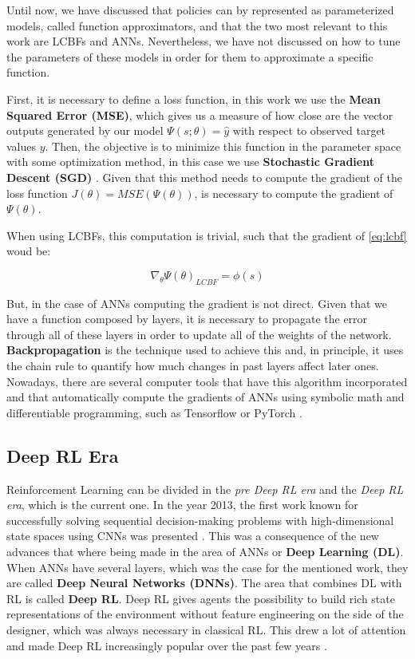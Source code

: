 Until now, we have discussed that policies can by represented as parameterized models, called function approximators, and that the two most relevant to this work are LCBFs and ANNs. Nevertheless, we have not discussed on how to tune the parameters of these models in order for them to approximate a specific function.

First, it is necessary to define a loss function, in this work we use the \textbf{Mean Squared Error (MSE)}, which gives us a measure of how close are the vector outputs generated by our model $\Psi(s;\theta)=\hat{y}$ with respect to observed target values $y$. Then, the objective is to minimize this function in the parameter space with some optimization method, in this case we use \textbf{Stochastic Gradient Descent (SGD)} \cite{robbins1951stochastic, saad1998online}. Given that this method needs to compute the gradient of the loss function $J(\theta)=MSE(\Psi(\theta))$, is necessary to compute the gradient of $\Psi(\theta)$.

When using LCBFs, this computation is trivial, such that the gradient of \ref{eq:lcbf} woud be:

\begin{equation}
    \nabla_{\theta} \Psi(\theta)_{LCBF} = \phi(s)
\end{equation}

But, in the case of ANNs computing the gradient is not direct. Given that we have a function composed by layers, it is necessary to propagate the error through all of these layers in order to update all of the weights of the network. \textbf{Backpropagation} \cite{rumelhart1988learning} is the technique used to achieve this and, in principle, it uses the chain rule to quantify how much changes in past layers affect later ones. Nowadays, there are several computer tools that have this algorithm incorporated and that automatically compute the gradients of ANNs using symbolic math and differentiable programming, such as Tensorflow \cite{tensorflow2015-whitepaper} or PyTorch \cite{paszke2017automatic}.

\subsection{Deep RL Era}

Reinforcement Learning can be divided in the \emph{pre Deep RL era} and the \emph{Deep RL era}, which is the current one. In the year 2013, the first work known for successfully solving sequential decision-making problems with high-dimensional state spaces using CNNs was presented \cite{atari}. This was a consequence of the new advances that where being made in the area of ANNs or \textbf{Deep Learning (DL)}. When ANNs have several layers, which was the case for the mentioned work, they are called \textbf{Deep Neural Networks (DNNs)}. The area that combines DL with RL is called \textbf{Deep RL}. Deep RL gives agents the possibility to build rich state representations of the environment without feature engineering on the side of the designer, which was always necessary in classical RL. This drew a lot of attention and made Deep RL increasingly popular over the past few years \cite{franccois2018introduction}.

